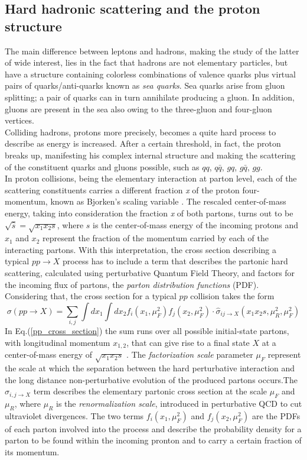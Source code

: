 \subsection{Hard hadronic scattering and the proton structure}
The main difference between leptons and hadrons, making the study of the latter of wide interest, lies in the fact that hadrons are not elementary particles, but have a structure containing colorless combinations of valence quarks plus virtual pairs of quarks/anti-quarks known as \emph{sea quarks}. Sea quarks arise from gluon splitting; a pair of quarks can in turn annihilate producing a gluon. In addition, gluons are present in the sea also owing to the three-gluon and four-gluon vertices.
\\
Colliding hadrons, protons more precisely, becomes a quite hard process to describe as energy is increased. After a certain threshold, in fact, the proton breaks up, manifesting his complex internal structure and making the scattering of the constituent quarks and gluons possible, such as $qq$, $q\bar{q}$, $gq$, $g\bar{q}$, $gg$.
\\
In proton collisions, being the elementary interaction at parton level, each of the scattering constituents carries a different fraction \emph{x} of the proton four-momentum, known as Bjorken's scaling variable \cite{altarelli2013collider}. The rescaled center-of-mass energy, taking into consideration the fraction \emph{x} of both partons, turns out to be $\sqrt{\hat{s}}=\sqrt{x_1x_2s}$, where $s$ is the center-of-mass energy of the incoming protons and $x_1$ and $x_2$ represent the fraction of the momentum carried by each of the interacting partons. With this interpretation, the cross section describing a typical $pp \rightarrow X$ process has to include a term that describes the partonic hard scattering, calculated using perturbative Quantum Field Theory, and factors for the incoming flux of partons, the \emph{parton distribution functions} (PDF).
\\
Considering that, the cross section for a typical $pp$ collision takes the form
\begin{equation}
\sigma(pp \rightarrow X) = \displaystyle\sum_{i,j} \int dx_1 \int dx_2f_i(x_1,\mu_F^2)f_j(x_2,\mu_F^2)\cdot\hat{\sigma}_{ij \rightarrow X}(x_1x_2s,\mu_R^2, \mu_F^2)
\label{pp_cross_section}
\end{equation}
In Eq.(\ref{pp_cross_section}) the sum runs over all possible initial-state partons, with longitudinal momentum $x_{1,2}$, that can give rise to a final state $X$ at a center-of-mass energy of $\sqrt{x_1x_2s}$ \cite{Butterworth_2012}. The \emph{factorization scale} parameter $\mu_F$ represent the scale at which the separation between the hard perturbative interaction and the long distance non-perturbative evolution of the produced partons occurs.The $\hat{\sigma}_{i,j \rightarrow X}$ term describes the elementary partonic cross section at the scale $\mu_F$ and $\mu_R$, where $\mu_R$ is the \emph{renormalization scale}, introduced in perturbative QCD to cut ultraviolet divergences. The two terms $f_i(x_1,\mu_F^2)$ and $f_j(x_2,\mu_F^2)$ are the PDFs of each parton involved into the process and describe the probability density for a parton to be found within the incoming pronton and to carry a certain fraction of its momentum.
